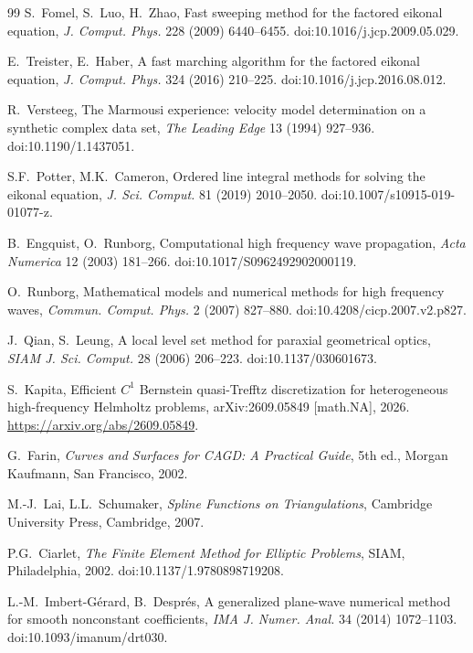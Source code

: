 \documentclass[preprint,12pt]{elsarticle}
\begin{document}
\begin{thebibliography}{99}
S.~Fomel, S.~Luo, H.~Zhao,
Fast sweeping method for the factored eikonal equation,
\emph{J. Comput. Phys.} 228 (2009) 6440--6455.
\newblock doi:10.1016/j.jcp.2009.05.029.

E.~Treister, E.~Haber,
A fast marching algorithm for the factored eikonal equation,
\emph{J. Comput. Phys.} 324 (2016) 210--225.
\newblock doi:10.1016/j.jcp.2016.08.012.

R.~Versteeg,
The Marmousi experience: velocity model determination on a synthetic complex data set,
\emph{The Leading Edge} 13 (1994) 927--936.
\newblock doi:10.1190/1.1437051.

S.F.~Potter, M.K.~Cameron,
Ordered line integral methods for solving the eikonal equation,
\emph{J. Sci. Comput.} 81 (2019) 2010--2050.
\newblock doi:10.1007/s10915-019-01077-z.

B.~Engquist, O.~Runborg,
Computational high frequency wave propagation,
\emph{Acta Numerica} 12 (2003) 181--266.
\newblock doi:10.1017/S0962492902000119.

O.~Runborg,
Mathematical models and numerical methods for high frequency waves,
\emph{Commun. Comput. Phys.} 2 (2007) 827--880.
\newblock doi:10.4208/cicp.2007.v2.p827.

J.~Qian, S.~Leung,
A local level set method for paraxial geometrical optics,
\emph{SIAM J. Sci. Comput.} 28 (2006) 206--223.
\newblock doi:10.1137/030601673.

S.~Kapita,
Efficient $C^1$ Bernstein quasi-Trefftz discretization for heterogeneous high-frequency Helmholtz problems,
arXiv:2609.05849 [math.NA], 2026.
\newblock \url{https://arxiv.org/abs/2609.05849}.

G.~Farin,
\emph{Curves and Surfaces for CAGD: A Practical Guide}, 5th ed.,
Morgan Kaufmann, San Francisco, 2002.

M.-J.~Lai, L.L.~Schumaker,
\emph{Spline Functions on Triangulations},
Cambridge University Press, Cambridge, 2007.

P.G.~Ciarlet,
\emph{The Finite Element Method for Elliptic Problems},
SIAM, Philadelphia, 2002.
\newblock doi:10.1137/1.9780898719208.

L.-M.~Imbert-G\'erard, B.~Despr\'es,
A generalized plane-wave numerical method for smooth nonconstant coefficients,
\emph{IMA J. Numer. Anal.} 34 (2014) 1072--1103.
\newblock doi:10.1093/imanum/drt030.


\end{thebibliography}
\end{document}
